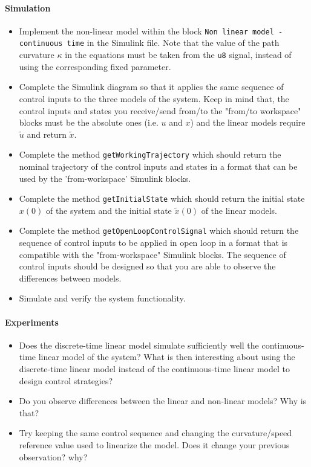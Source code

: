 \paragraph{Simulation}
	\begin{itemize}
		\setlength\itemsep{0em}
		\item Implement the non-linear model within the block \texttt{Non linear model - continuous time} in the Simulink file. 
		Note that the value of the path curvature $\kappa$ in the equations must be taken from the \texttt{u8} signal, instead of using the corresponding fixed parameter. 
		\item Complete the Simulink diagram so that it applies the same sequence of control inputs to the three models of the system. 
		Keep in mind that, the control inputs and states you receive/send from/to the "from/to workspace" blocks must be the absolute ones (i.e. $u$ and $x$) and the linear models require $\tilde{u}$ and return $\tilde{x}$.
		\item Complete the method \texttt{getWorkingTrajectory} which should return the nominal trajectory of the control inputs and states in a format that can be used by the 'from-workspace' Simulink blocks. 
		\item Complete the method \texttt{getInitialState} which should return the initial state $x(0)$ of the system and the initial state $\tilde{x}(0)$ of the linear models.
		\item Complete the method \texttt{getOpenLoopControlSignal} which should return the sequence of control inputs to be applied in open loop in a format that is compatible with the "from-workspace" Simulink blocks.
		The sequence of control inputs should be designed so that you are able to observe the differences between models.
		\item Simulate and verify the system functionality. 
	\end{itemize}	
\paragraph{Experiments}	
	\begin{itemize}
		\setlength\itemsep{0em}
		\item Does the discrete-time linear model simulate sufficiently well the continuous-time linear model of the system?
		What is then interesting about using the discrete-time linear model instead of the continuous-time linear model to design control strategies?  
		\item Do you observe differences between the linear and non-linear models? Why is that? 
		\item Try keeping the same control sequence and changing the curvature/speed reference value used to linearize the model. 
		Does it change your previous observation? why?
	\end{itemize}

